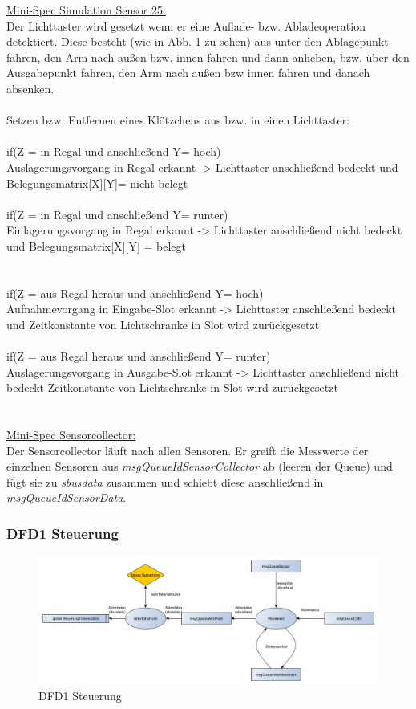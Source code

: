 \underline{Mini-Spec Simulation Sensor 25:}\\
Der Lichttaster wird gesetzt wenn er eine Auflade- bzw. Abladeoperation detektiert. Diese besteht (wie in Abb. \ref{fig3} zu sehen) aus unter den Ablagepunkt fahren, den Arm nach außen bzw. innen fahren und dann anheben, bzw. über den Ausgabepunkt fahren, den Arm nach außen bzw innen fahren und danach absenken.\\ \\
Setzen bzw. Entfernen eines Klötzchens aus bzw. in einen Lichttaster:\\ \\
if(Z = in Regal und anschließend Y= hoch) \\
Auslagerungsvorgang in Regal erkannt -> Lichttaster anschließend bedeckt und Belegungsmatrix[X][Y]= nicht belegt\\
\\
if(Z = in Regal und anschließend Y= runter)\\
Einlagerungsvorgang in Regal erkannt -> Lichttaster anschließend nicht bedeckt und Belegungsmatrix[X][Y] = belegt \\
\\
\\
if(Z = aus Regal heraus und anschließend Y= hoch)\\
Aufnahmevorgang in Eingabe-Slot erkannt -> Lichttaster anschließend bedeckt und Zeitkonstante von Lichtschranke in Slot wird zurückgesetzt\\
\\
if(Z = aus Regal heraus und anschließend Y= runter)\\
Auslagerungsvorgang in Ausgabe-Slot erkannt -> Lichttaster anschließend nicht bedeckt  Zeitkonstante von Lichtschranke in Slot wird zurückgesetzt\ \\
\\
\\
\underline{Mini-Spec Sensorcollector:}\\
Der Sensorcollector läuft nach allen Sensoren. Er  greift die Messwerte der einzelnen Sensoren aus \textit{msgQueueIdSensorCollector} ab (leeren der Queue) und fügt sie zu \textit{sbusdata} zusammen und schiebt diese anschließend in \textit{msgQueueIdSensorData}.\\ 


\subsubsection{DFD1 Steuerung}
\begin{figure}[H]
	\centering
  \includegraphics[width=\textwidth]{DFD/dfd1_steuerung.png}
	\caption{DFD1 Steuerung}
	\label{fig3}
\end{figure}

